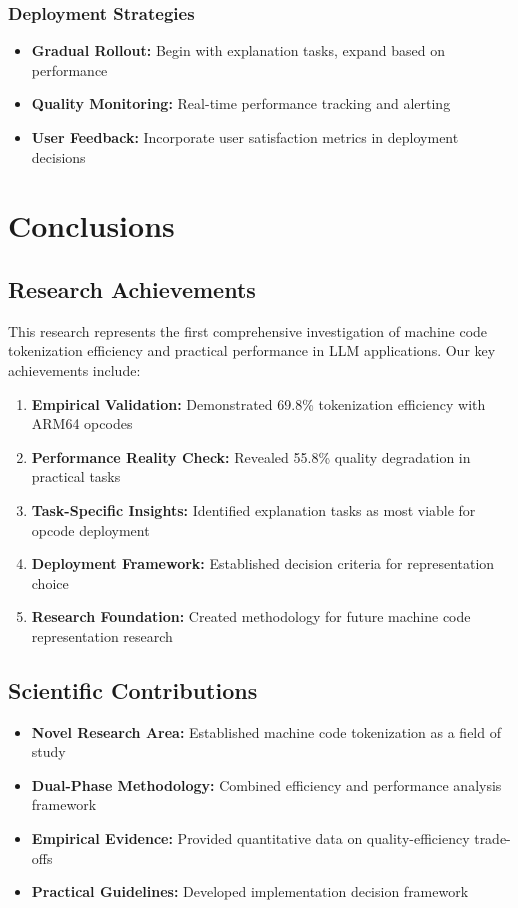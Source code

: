 \documentclass[11pt,a4paper]{article}
\begin{document}
\subsubsection{Deployment Strategies}
\begin{itemize}
    \item \textbf{Gradual Rollout:} Begin with explanation tasks, expand based on performance
    \item \textbf{Quality Monitoring:} Real-time performance tracking and alerting
    \item \textbf{User Feedback:} Incorporate user satisfaction metrics in deployment decisions
\end{itemize}

\section{Conclusions}

\subsection{Research Achievements}
This research represents the first comprehensive investigation of machine code tokenization efficiency and practical performance in LLM applications. Our key achievements include:

\begin{enumerate}
    \item \textbf{Empirical Validation:} Demonstrated 69.8\% tokenization efficiency with ARM64 opcodes
    \item \textbf{Performance Reality Check:} Revealed 55.8\% quality degradation in practical tasks
    \item \textbf{Task-Specific Insights:} Identified explanation tasks as most viable for opcode deployment
    \item \textbf{Deployment Framework:} Established decision criteria for representation choice
    \item \textbf{Research Foundation:} Created methodology for future machine code representation research
\end{enumerate}

\subsection{Scientific Contributions}
\begin{itemize}
    \item \textbf{Novel Research Area:} Established machine code tokenization as a field of study
    \item \textbf{Dual-Phase Methodology:} Combined efficiency and performance analysis framework
    \item \textbf{Empirical Evidence:} Provided quantitative data on quality-efficiency trade-offs
    \item \textbf{Practical Guidelines:} Developed implementation decision framework
\end{itemize}
\end{document}
